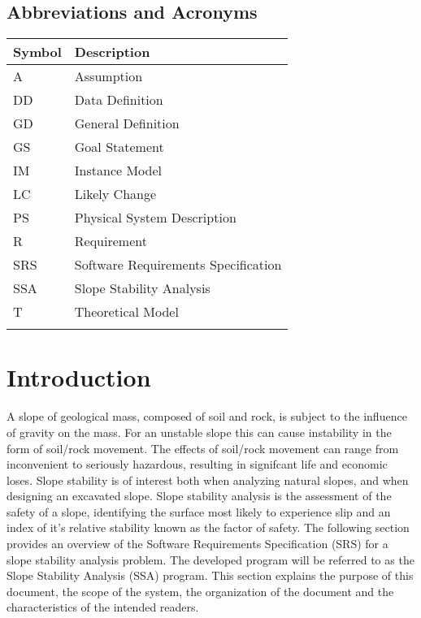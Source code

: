 \documentclass[12pt]{article}
\begin{document}
\subsection{Abbreviations and Acronyms}
\label{Sec:AaA}
\begin{longtable*}{l l}
\toprule
Symbol & Description
\\
\midrule
A & Assumption
\\
DD & Data Definition
\\
GD & General Definition
\\
GS & Goal Statement
\\
IM & Instance Model
\\
LC & Likely Change
\\
PS & Physical System Description
\\
R & Requirement
\\
SRS & Software Requirements Specification
\\
SSA & Slope Stability Analysis
\\
T & Theoretical Model
\\
\bottomrule
\label{Table:AaA}
\end{longtable*}
\section{Introduction}
\label{Sec:I}
A slope of geological mass, composed of soil and rock, is subject to the influence of gravity on the mass. For an unstable slope this can cause instability in the form of soil/rock movement. The effects of soil/rock movement can range from inconvenient to seriously hazardous, resulting in signifcant life and economic loses. Slope stability is of interest both when analyzing natural slopes, and when designing an excavated slope. Slope stability analysis is the assessment of the safety of a slope, identifying the surface most likely to experience slip and an index of it's relative stability known as the factor of safety.
The following section provides an overview of the Software Requirements Specification (SRS) for a slope stability analysis problem. The developed program will be referred to as the Slope Stability Analysis (SSA) program. This section explains the purpose of this document, the scope of the system, the organization of the document and the characteristics of the intended readers.
\end{document}
